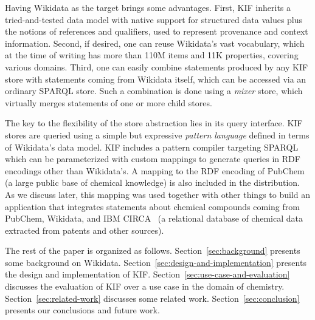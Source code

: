 


Having Wikidata as the target brings some advantages.
First, KIF inherits a tried-and-tested data model with native support for structured data values plus the notions of references and qualifiers, used to represent provenance and context information.
Second, if desired, one can reuse Wikidata's vast vocabulary, which at the time of writing has more than 110M items and 11K properties, covering various domains.
Third, one can easily combine statements produced by any KIF store with statements coming from Wikidata itself, which can be accessed via an ordinary SPARQL store.
Such a combination is done using a \emph{mixer} store, which virtually merges statements of one or more child stores.


The key to the flexibility of the store abstraction lies in its query interface.
KIF stores are queried using a simple but expressive \emph{pattern language} defined in terms of Wikidata's data model.
KIF includes a pattern compiler targeting SPARQL which can be parameterized with custom mappings to generate queries in RDF encodings other than Wikidata's.
A mapping to the RDF encoding of PubChem~\cite{Kim-S-2023} (a large public base of chemical knowledge) is also included in the distribution.
As we discuss later, this mapping was used together with other things to build an application that integrates statements about chemical compounds coming from PubChem, Wikidata, and IBM CIRCA~\cite{IBM-CIRCA} (a relational database of chemical data extracted from patents and other sources).


The rest of the paper is organized as follows.
Section~\ref{sec:background} presents some background on Wikidata.
Section~\ref{sec:design-and-implementation} presents the design and implementation of KIF\@.
Section~\ref{sec:use-case-and-evaluation} discusses the evaluation of KIF over a use case in the domain of chemistry.
Section~\ref{sec:related-work} discusses some related work.
Section~\ref{sec:conclusion} presents our conclusions and future work.





